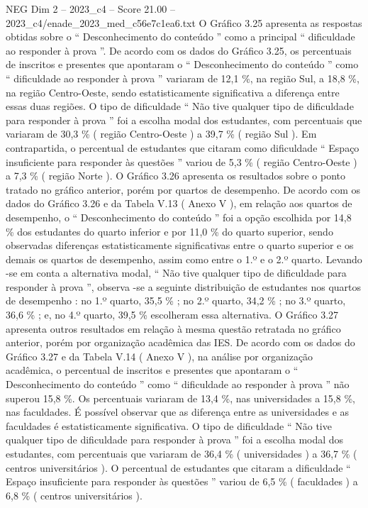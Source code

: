 \begin{textsample}{NEG Dim 2 – 2023\_c4 – Score 21.00 – 2023\_c4/enade\_2023\_med\_c56e7c1ea6.txt}
O Gráfico 3.25 apresenta as respostas obtidas sobre o “ Desconhecimento do conteúdo ” como a principal “ dificuldade ao responder à prova ”.
De acordo com os dados do Gráfico 3.25, os percentuais de inscritos e presentes que apontaram o “ Desconhecimento do conteúdo ” como “ dificuldade ao responder à prova ” variaram de 12,1 \%, na região Sul, a 18,8 \%, na região Centro-Oeste, sendo estatisticamente significativa a diferença entre essas duas regiões.
O tipo de dificuldade “ Não tive qualquer tipo de dificuldade para responder à prova ” foi a escolha modal dos estudantes, com percentuais que variaram de 30,3 \% ( região Centro-Oeste ) a 39,7 \% ( região Sul ).
Em contrapartida, o percentual de estudantes que citaram como dificuldade “ Espaço insuficiente para responder às questões ” variou de 5,3 \% ( região Centro-Oeste ) a 7,3 \% ( região Norte ).
O Gráfico 3.26 apresenta os resultados sobre o ponto tratado no gráfico anterior, porém por quartos de desempenho.
De acordo com os dados do Gráfico 3.26 e da Tabela V.13 ( Anexo V ), em relação aos quartos de desempenho, o “ Desconhecimento do conteúdo ” foi a opção escolhida por 14,8 \% dos estudantes do quarto inferior e por 11,0 \% do quarto superior, sendo observadas diferenças estatisticamente significativas entre o quarto superior e os demais os quartos de desempenho, assim como entre o 1.º e o 2.º quarto.
Levando -se em conta a alternativa modal, “ Não tive qualquer tipo de dificuldade para responder à prova ”, observa -se a seguinte distribuição de estudantes nos quartos de desempenho : no 1.º quarto, 35,5 \% ; no 2.º quarto, 34,2 \% ; no 3.º quarto, 36,6 \% ; e, no 4.º quarto, 39,5 \% escolheram essa alternativa.
O Gráfico 3.27 apresenta outros resultados em relação à mesma questão retratada no gráfico anterior, porém por organização acadêmica das IES.
De acordo com os dados do Gráfico 3.27 e da Tabela V.14 ( Anexo V ), na análise por organização acadêmica, o percentual de inscritos e presentes que apontaram o “ Desconhecimento do conteúdo ” como “ dificuldade ao responder à prova ” não superou 15,8 \%.
Os percentuais variaram de 13,4 \%, nas universidades a 15,8 \%, nas faculdades.
É possível observar que as diferença entre as universidades e as faculdades é estatisticamente significativa.
O tipo de dificuldade “ Não tive qualquer tipo de dificuldade para responder à prova ” foi a escolha modal dos estudantes, com percentuais que variaram de 36,4 \% ( universidades ) a 36,7 \% ( centros universitários ).
O percentual de estudantes que citaram a dificuldade “ Espaço insuficiente para responder às questões ” variou de 6,5 \% ( faculdades ) a 6,8 \% ( centros universitários ).

\end{textsample}
